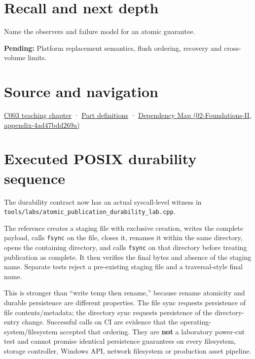\section{Recall and next depth}\label{appendix-e89a8f290ef5-recall-and-next-depth}

Name the observers and failure model for an atomic guarantee.

\textbf{Pending:} Platform replacement semantics, flush ordering, recovery and cross-volume limits.

\section{Source and navigation}\label{appendix-e89a8f290ef5-source-and-navigation}

\href{Continuous\%20Notes/Computing\%20Foundations\%20-\%20From\%20Bits\%20to\%20C++\%20and\%20Systems\%20APIs\#Where\%20the\%20bytes\%20live}{C003 teaching chapter} · \hyperref[appendix-fd090d982a15-m003---parts-41-60]{Part definitions} · \href{../02-Foundations-II/main.pdf\#nameddest=appendix-4ad47bdd269a}{Dependency Map (02-Foundations-II, appendix-4ad47bdd269a)}

\section{Executed POSIX durability sequence}\label{appendix-e89a8f290ef5-executed-posix-durability-sequence}

The durability contract now has an actual syscall-level witness in \texttt{tools/labs/atomic\_publication\_durability\_lab.cpp}.

The reference creates a staging file with exclusive creation, writes the complete payload, calls \texttt{fsync} on the file, closes it, renames it within the same directory, opens the containing directory, and calls \texttt{fsync} on that directory before treating publication as complete. It then verifies the final bytes and absence of the staging name. Separate tests reject a pre-existing staging file and a traversal-style final name.

This is stronger than ``write temp then rename,'' because rename atomicity and durable persistence are different properties. The file sync requests persistence of file contents/metadata; the directory sync requests persistence of the directory-entry change. Successful calls on CI are evidence that the operating-system/filesystem accepted that ordering. They are \textbf{not} a laboratory power-cut test and cannot promise identical persistence guarantees on every filesystem, storage controller, Windows API, network filesystem or production asset pipeline.
